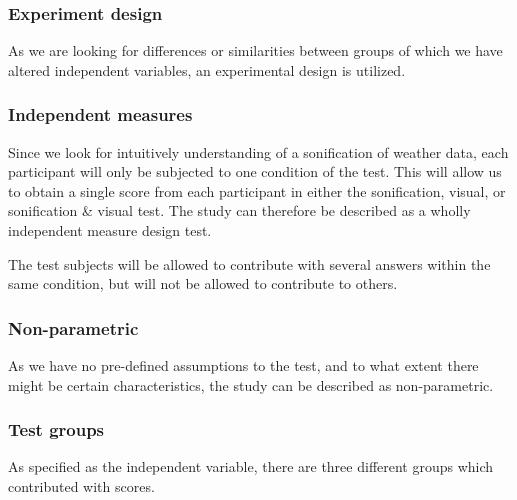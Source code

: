 
\subsubsection{Experiment design} %
\label{ssub:experiment_design}

As we are looking for differences or similarities between groups of which we have altered independent variables, an experimental design is utilized.


\subsubsection{Independent measures} %
\label{ssub:independent_measures}

Since we look for intuitively understanding of a sonification of weather data, each participant will only be subjected to one condition of the test. 
This will allow us to obtain a single score from each participant in either the sonification, visual, or sonification \& visual test. 
The study can therefore be described as a wholly independent measure design test.


The test subjects will be allowed to contribute with several answers within the same condition, but will not be allowed to contribute to others.


\subsubsection{Non-parametric} %
\label{ssub:non_parametric}

As we have no pre-defined assumptions to the test, and to what extent there might be certain characteristics, the study can be described as non-parametric.


\subsubsection{Test groups} %
\label{ssub:test_groups}

As specified as the independent variable, there are three different groups which contributed with scores.


